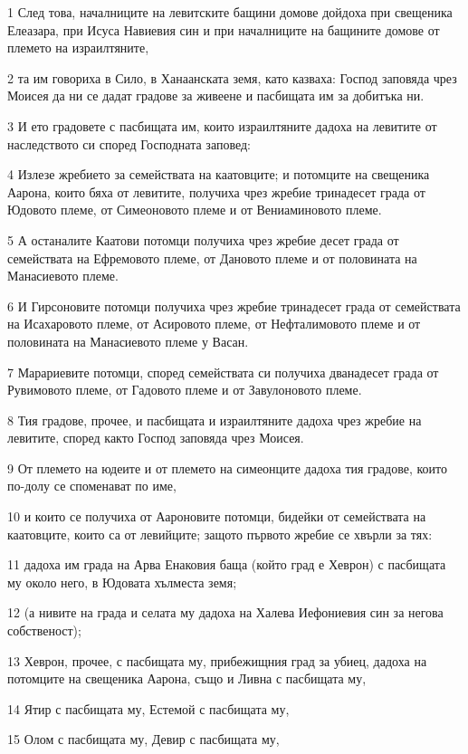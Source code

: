 \par 1 След това, началниците на левитските бащини домове дойдоха при свещеника Елеазара, при Исуса Навиевия син и при началниците на бащините домове от племето на израилтяните,
\par 2 та им говориха в Сило, в Ханаанската земя, като казваха: Господ заповяда чрез Моисея да ни се дадат градове за живеене и пасбищата им за добитъка ни.
\par 3 И ето градовете с пасбищата им, които израилтяните дадоха на левитите от наследството си според Господната заповед:
\par 4 Излезе жребието за семействата на каатовците; и потомците на свещеника Аарона, които бяха от левитите, получиха чрез жребие тринадесет града от Юдовото племе, от Симеоновото племе и от Вениаминовото племе.
\par 5 А останалите Каатови потомци получиха чрез жребие десет града от семействата на Ефремовото племе, от Дановото племе и от половината на Манасиевото племе.
\par 6 И Гирсоновите потомци получиха чрез жребие тринадесет града от семействата на Исахаровото племе, от Асировото племе, от Нефталимовото племе и от половината на Манасиевото племе у Васан.
\par 7 Марариевите потомци, според семействата си получиха дванадесет града от Рувимовото племе, от Гадовото племе и от Завулоновото племе.
\par 8 Тия градове, прочее, и пасбищата и израилтяните дадоха чрез жребие на левитите, според както Господ заповяда чрез Моисея.
\par 9 От племето на юдеите и от племето на симеонците дадоха тия градове, които по-долу се споменават по име,
\par 10 и които се получиха от Аароновите потомци, бидейки от семействата на каатовците, които са от левийците; защото първото жребие се хвърли за тях:
\par 11 дадоха им града на Арва Енаковия баща (който град е Хеврон) с пасбищата му около него, в Юдовата хълместа земя;
\par 12 (а нивите на града и селата му дадоха на Халева Иефониевия син за негова собственост);
\par 13 Хеврон, прочее, с пасбищата му, прибежищния град за убиец, дадоха на потомците на свещеника Аарона, също и Ливна с пасбищата му,
\par 14 Ятир с пасбищата му, Естемой с пасбищата му,
\par 15 Олом с пасбищата му, Девир с пасбищата му,
